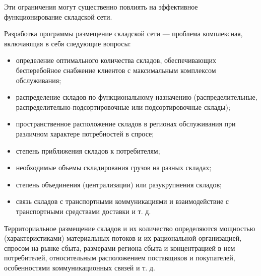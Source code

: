 Эти ограничения могут существенно повлиять на эффективное функционирование складской сети.

Разработка программы размещение складской сети --- проблема комплексная, включающая в себя следующие вопросы:
\begin{itemize}
	\item определение оптимального количества складов, обеспечивающих бесперебойное снабжение клиентов с максимальным комплексом обслуживания;
	\item распределение складов по функциональному назначению (распределительные, распределительно-подсортировочные или подсортировочные склады);
	\item пространственное расположение складов в регионах обслуживания при различном характере потребностей в спросе;
	\item степень приближения складов к потребителям;
	\item необходимые объемы складирования грузов на разных складах;
	\item степень объединения (централизации) или разукрупнения складов;
	\item связь складов с транспортными коммуникациями и взаимодействие с транспортными средствами доставки и т. д.
\end{itemize}

Территориальное размещение складов и их количество определяются мощностью (характеристиками) материальных потоков и их рациональной организацией, спросом на рынке сбыта, размерами региона сбыта и концентрацией в нем потребителей, относительным расположением поставщиков и покупателей, особенностями коммуникационных связей и т. д.

